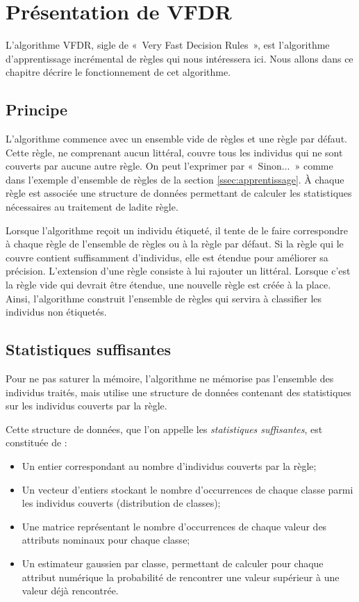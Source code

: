 \section{Présentation de VFDR}

        L’algorithme VFDR, sigle de «~Very Fast Decision Rules~», est l’algorithme d’apprentissage incrémental de règles qui nous intéressera ici. Nous allons dans ce chapitre décrire le fonctionnement de cet algorithme.

        \subsection{Principe}

            L’algorithme commence avec un ensemble vide de règles et une règle par défaut. Cette règle, ne comprenant aucun littéral, couvre tous les individus qui ne sont couverts par aucune autre règle. On peut l'exprimer par «~Sinon...~» comme dans l'exemple d’ensemble de règles de la section \ref{ssec:apprentissage}. À chaque règle est associée une structure de données permettant de calculer les statistiques nécessaires au traitement de ladite règle.

            Lorsque l’algorithme reçoit un individu étiqueté, il tente de le faire correspondre à chaque règle de l’ensemble de règles ou à la règle par défaut. Si la règle qui le couvre contient suffisamment d’individus, elle est étendue pour améliorer sa précision. L’extension d’une règle consiste à lui rajouter un littéral. Lorsque c’est la règle vide qui devrait être étendue, une nouvelle règle est créée à la place. Ainsi, l’algorithme construit l’ensemble de règles qui servira à classifier les individus non étiquetés.

        \subsection{Statistiques suffisantes}\label{ssec:stats}

            Pour ne pas saturer la mémoire, l’algorithme ne mémorise pas l’ensemble des individus traités, mais utilise une structure de données contenant des statistiques sur les individus couverts par la règle.

            Cette structure de données, que l’on appelle les \emph{statistiques suffisantes}, est constituée de :
            \begin{itemize}
                \item Un entier correspondant au nombre d’individus couverts par la règle;
                \item Un vecteur d’entiers stockant le nombre d’occurrences de chaque classe parmi les individus couverts (distribution de classes);
                \item Une matrice représentant le nombre d'occurrences de chaque valeur des attributs nominaux pour chaque classe;
                \item Un estimateur gaussien par classe, permettant de calculer pour chaque attribut numérique la probabilité de rencontrer une valeur supérieur à une valeur déjà rencontrée.
            \end{itemize}

